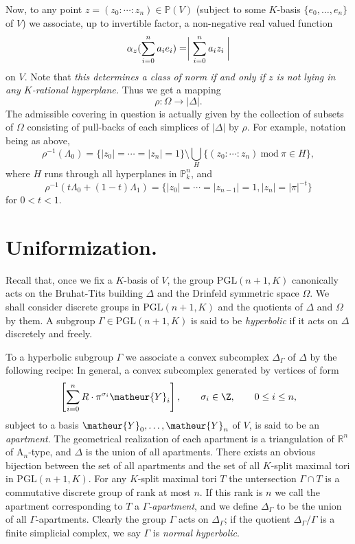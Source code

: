 Now, to any point $z=(z_0\colon\cdots\colon z_n)\in\mathbb{P}(V)$
(subject to some $K$-basis $\{e_0,\ldots,e_n\}$of $V$) 
we associate, up to invertible factor, a non-negative real
valued function
$$
\alpha_z(\sum^n_{i=0}a_ie_i)=\biggm|
\sum_{i=0}^n a_iz_i\biggm|
$$
on $V$.
Note that 
{\it this determines a class of norm if and only if $z$ is not lying in any 
$K$-rational hyperplane.}
Thus we get a mapping 
$$
\rho\colon\Omega\longrightarrow |\Delta|.
$$
The admissible covering in question is actually given by the collection
of subsets of $\Omega$ consisting of pull-backs of each simplices of
$|\Delta|$ by $\rho$.
For example, notation being as above, 
$$
\rho^{-1}(\Lambda_0)=\{|z_0|=\cdots=|z_n|=1\}\setminus
\bigcup_{H}\{(z_0\colon\cdots\colon z_n)\ \mathrm{mod}\ \pi\in H\},
$$
where $H$ runs through all hyperplanes in $\mathbb{P}^n_k$, and 
$$
\rho^{-1}(t\Lambda_0+(1-t)\Lambda_1)=\{|z_0|=\cdots=|z_{n-1}|=1,
|z_n|=|\pi|^{-t}\}
$$
for $0<t<1$.

%
\section{Uniformization.}
%

Recall that, once we fix a $K$-basis of $V$, the group 
$\mathrm{PGL}(n+1,K)$ canonically acts on the Bruhat-Tits building 
$\Delta$ and the Drinfeld symmetric space $\Omega$.
We shall consider discrete groups in $\mathrm{PGL}(n+1,K)$ and the
quotients of $\Delta$ and $\Omega$ by them.
A subgroup $\Gamma\in\mathrm{PGL}(n+1,K)$ is said to be {\it
hyperbolic} if it acts on $\Delta$ discretely and freely.

To a hyperbolic subgroup $\Gamma$ we associate a convex subcomplex 
$\Delta_{\Gamma}$ of $\Delta$ by the following recipe:
In general, a convex subcomplex generated by vertices of form
$$
\left[\sum^n_{i=0}R\cdot\pi^{\sigma_i}\matheur{Y}_i\right],
\qquad
\sigma_i\in\Z,\qquad 0\leq i\leq n,
$$
subject to a basis $\matheur{Y}_0,\ldots,\matheur{Y}_n$ of $V$, is said
to be an {\it apartment}.
The geometrical realization of each apartment is a triangulation of 
$\mathbb{R}^n$ of $\mathrm{A}_n$-type, and $\Delta$ is the union of all
apartments.
There exists an obvious bijection between the set of all apartments and
the set of all $K$-split maximal tori in $\mathrm{PGL}(n+1,K)$.
For any $K$-split maximal tori $T$ the untersection $\Gamma\cap T$ is a
commutative discrete group of rank at most $n$.
If this rank is $n$ we call the apartment corresponding to $T$ a 
{\it $\Gamma$-apartment}, and we define $\Delta_{\Gamma}$ to be the
union of all $\Gamma$-apartments.
Clearly the group $\Gamma$ acts on $\Delta_{\Gamma}$; if the quotient
$\Delta_{\Gamma}/\Gamma$ is a finite simplicial complex, we say 
$\Gamma$ is {\it normal hyperbolic}.

